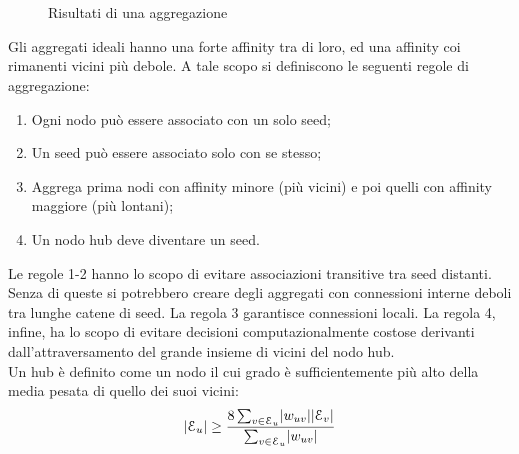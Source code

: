 \begin{figure}%
\centering
{} \quad
{} \\
 \\
\caption{Risultati di una aggregazione}
\label{fig:seeds}%
\end{figure}%

Gli aggregati ideali hanno una forte affinity tra di loro, ed una affinity coi rimanenti vicini più debole. 
A tale scopo si definiscono le seguenti regole di aggregazione:

\begin{enumerate}
\item Ogni nodo può essere associato con un solo seed;
\item Un seed può essere associato solo con se stesso;
\item Aggrega prima nodi con affinity minore (più vicini) e poi quelli con affinity maggiore (più lontani);
\item Un nodo hub deve diventare un seed.
\end{enumerate}

Le regole 1-2 hanno lo scopo di evitare associazioni transitive tra seed distanti. Senza di queste si potrebbero creare degli aggregati con connessioni interne deboli tra lunghe catene di seed.
La regola 3 garantisce connessioni locali.
La regola 4, infine, ha lo scopo di evitare decisioni computazionalmente costose derivanti dall'attraversamento del grande insieme di vicini del nodo hub.\\
Un hub è definito come un nodo il cui grado è sufficientemente più alto della media pesata di quello dei suoi vicini:
\begin{equation}
\label{eqn:HubNode}
\lvert\mathcal{E}_u\rvert \ge \frac{ 8\sum_{v\in\mathcal{E}_u} \lvert w_{uv}\rvert\lvert\mathcal{E}_v\rvert }{ \sum_{v\in\mathcal{E}_u}\lvert w_{uv}\rvert }
\end{equation}


